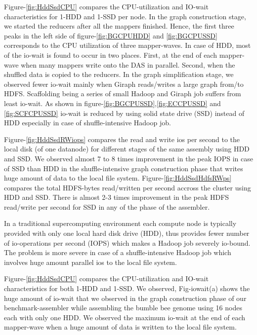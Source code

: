 \documentclass[conference]{IEEEtran}
\begin{document}
Figure-\ref{fig:HddSsdCPU} compares the CPU-utilization and IO-wait characteristics for 1-HDD and 1-SSD per node.
In the graph construction stage, we started the reducers after all the mappers finished. 
Hence, the first three peaks in the left side of figure-\ref{fig:BGCPUHDD} and \ref{fig:BGCPUSSD} corresponds to the CPU utilization of three mapper-waves. 
In case of HDD, most of the io-wait is found to occur in two places. First, at the end of each mapper-wave when many mappers write onto the DAS in parallel. Second, when the shuffled data is copied to the reducers.
In the graph simplification stage, we observed fewer io-wait mainly when Giraph reads/writes a large graph from/to HDFS.
Scaffolding being a series of small Hadoop and Giraph job suffers from least io-wait. 
As shown in figure-\ref{fig:BGCPUSSD},\ref{fig:ECCPUSSD} and \ref{fig:SCFCPUSSD} io-wait is reduced by using solid state drive (SSD) instead of HDD especially in case of shuffle-intensive Hadoop job. 

Figure-\ref{fig:HddSsdRWiops} compares the read and write ios per second to the local disk (of one datanode) for different stages of the same assembly using HDD and SSD.
We observed almost 7 to 8 times improvement in the peak IOPS in case of SSD than HDD in the shuffle-intensive graph construction phase that writes huge amount of data to the local file system.
Figure-\ref{fig:HddSsdHdfsRWps} compares the total HDFS-bytes read/written per second accross the cluster using HDD and SSD. 
There is almost 2-3 times improvement in the peak HDFS read/write per second for SSD in any of the phase of the assembler.

In a traditional supercomputing environment each compute node is typically provided with only one local hard disk drive (HDD), thus provides fewer number of io-operations per second (IOPS) which makes a Hadoop job severely io-bound.
The problem is more severe in case of a shuffle-intensive Hadoop job which involves huge amount parallel ios to the local file system.

Figure-\ref{fig:HddSsdCPU} compares the CPU-utilization and IO-wait characteristics for both 1-HDD and 1-SSD.
We observed, Fig-iowait(a) shows the huge amount of io-wait that we observed in the graph construction phase of our benchmark-assembler while assembling the bumble bee genome using 16 nodes each with only one HDD.
We observed the maximum io-wait at the end of each mapper-wave when a huge amount of data is written to the local file system. 
\end{document}
